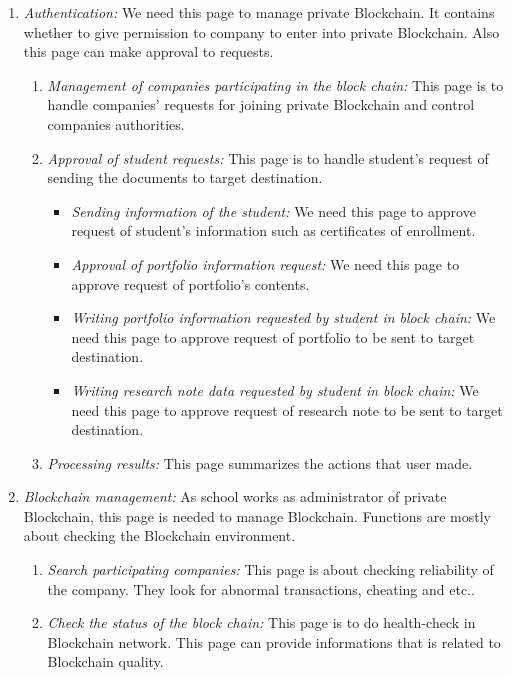 \documentclass[conference]{IEEEtran}
\begin{document}
\begin{enumerate}
    \item \textit {Authentication:} We need this page to manage private Blockchain. It contains whether to give permission to company to enter into private Blockchain. Also this page can make approval to requests. \\
    \begin{enumerate}
    	\item \textit {Management of companies participating in the block chain:} This page is to handle companies’ requests for joining private Blockchain and control companies authorities.\\
        \item \textit {Approval of student requests:} This page is to handle student’s request of sending the documents to target destination.\\
        \begin{itemize}
	\item \textit {Sending information of the student:} We need this page to approve request of student’s information such as certificates of enrollment.\\
	\item \textit {Approval of portfolio information request:} We need this page to approve request of portfolio's contents.\\
	\item \textit {Writing portfolio information requested by student in block chain:} We need this page to approve request of portfolio to be sent to target destination.\\
	\item \textit {Writing research note data requested by student in block chain:} We need this page to approve request of research note to be sent to target destination.\\
	\end{itemize}
         \item \textit {Processing results:} This page summarizes the actions that user made. \\
    \end{enumerate}
    
       \item \textit {Blockchain management:} As school works as administrator of private Blockchain, this page is needed to manage Blockchain. Functions are mostly about checking the Blockchain environment.\\
    \begin{enumerate}
    	\item  \textit {Search participating companies:} This page is about checking reliability of the company. They look for abnormal transactions, cheating and etc..\\
        \item \textit {Check the status of the block chain:} This page is to do health-check in Blockchain network. This page can provide informations that is related to Blockchain quality.\\
    \end{enumerate}
        
\end{enumerate}
\end{document}
